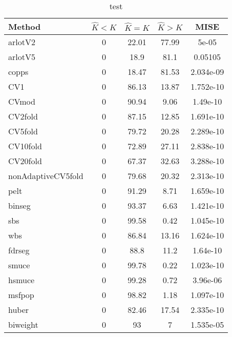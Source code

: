 \begin{table}[ht]
\centering
\begin{tabular}{l|cccc}
  \hline
Method & $\hat{K} < K$ & $\hat{K} = K$ & $\hat{K} > K$ & MISE \\ 
  \hline
arlotV2 &     0 & 22.01 & 77.99 & 5e-05 \\ 
  arlotV5 &     0 &  18.9 &  81.1 & 0.05105 \\ 
  copps &     0 & 18.47 & 81.53 & 2.034e-09 \\ 
  CV1 &     0 & 86.13 & 13.87 & 1.752e-10 \\ 
  CVmod &     0 & 90.94 &  9.06 & 1.49e-10 \\ 
  CV2fold &     0 & 87.15 & 12.85 & 1.691e-10 \\ 
  CV5fold &     0 & 79.72 & 20.28 & 2.289e-10 \\ 
  CV10fold &     0 & 72.89 & 27.11 & 2.838e-10 \\ 
  CV20fold &     0 & 67.37 & 32.63 & 3.288e-10 \\ 
  nonAdaptiveCV5fold &     0 & 79.68 & 20.32 & 2.313e-10 \\ 
  pelt &     0 & 91.29 &  8.71 & 1.659e-10 \\ 
  binseg &     0 & 93.37 &  6.63 & 1.421e-10 \\ 
  sbs &     0 & 99.58 &  0.42 & 1.045e-10 \\ 
  wbs &     0 & 86.84 & 13.16 & 1.624e-10 \\ 
  fdrseg &     0 &  88.8 &  11.2 & 1.64e-10 \\ 
  smuce &     0 & 99.78 &  0.22 & 1.023e-10 \\ 
  hsmuce &     0 & 99.28 &  0.72 & 3.96e-06 \\ 
  msfpop &     0 & 98.82 &  1.18 & 1.097e-10 \\ 
  huber &     0 & 82.46 & 17.54 & 2.335e-10 \\ 
  biweight &     0 &    93 &     7 & 1.535e-05 \\ 
   \hline
\end{tabular}
\caption{test} 
\end{table}
